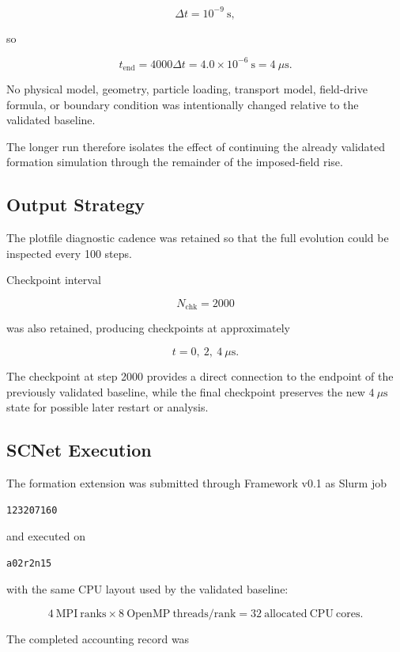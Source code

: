 \documentclass[11pt,a4paper]{article}
\begin{document}
\[
\Delta t = 10^{-9}\ \mathrm{s},
\]

so

\[
t_{\mathrm{end}}
=
4000\Delta t
=
4.0\times10^{-6}\ \mathrm{s}
=
4~\mu\mathrm{s}.
\]

No physical model, geometry, particle loading, transport model, field-drive
formula, or boundary condition was intentionally changed relative to the
validated baseline.

The longer run therefore isolates the effect of continuing the already
validated formation simulation through the remainder of the imposed-field
rise.

\subsection{Output Strategy}

The plotfile diagnostic cadence was retained so that the full evolution could
be inspected every 100 steps.

Checkpoint interval

\[
N_{\mathrm{chk}} = 2000
\]

was also retained, producing checkpoints at approximately

\[
t=0,\ 2,\ 4~\mu\mathrm{s}.
\]

The checkpoint at step 2000 provides a direct connection to the endpoint of
the previously validated baseline, while the final checkpoint preserves the
new \(4~\mu\mathrm{s}\) state for possible later restart or analysis.

\subsection{SCNet Execution}

The formation extension was submitted through Framework v0.1 as Slurm job

\begin{lstlisting}
123207160
\end{lstlisting}

and executed on

\begin{lstlisting}
a02r2n15
\end{lstlisting}

with the same CPU layout used by the validated baseline:

\[
4~\mathrm{MPI~ranks}
\times
8~\mathrm{OpenMP~threads/rank}
=
32~\mathrm{allocated~CPU~cores}.
\]

The completed accounting record was
\end{document}
